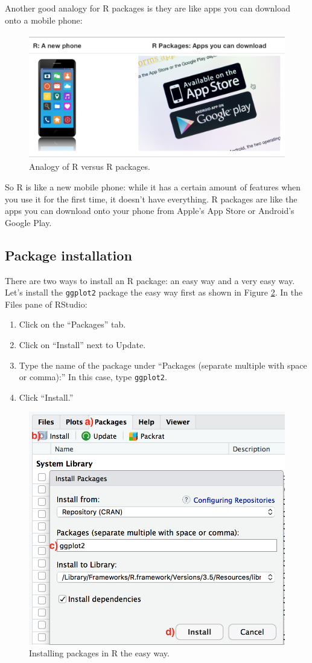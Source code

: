 \documentclass[
  12pt,
  oneside]{book}
\providecommand{\tightlist}{%
  \setlength{\itemsep}{0pt}\setlength{\parskip}{0pt}}
\begin{document}
Another good analogy for R packages  is they are like apps you can download onto a mobile phone:

\begin{figure}
\includegraphics[width=0.7\linewidth]{fig/R_vs_R_packages} \caption{Analogy of R versus R packages.}\label{fig:R-vs-R-packages}
\end{figure}

So R is like a new mobile phone: while it has a certain amount of features when you use it for the first time, it doesn't have everything. R packages are like the apps you can download onto your phone from Apple's App Store or Android's Google Play.

\hypertarget{package-installation}{%
\subsection{Package installation}\label{package-installation}}

There are two ways to install an R package: an easy way and a very easy way.  Let's install the \texttt{ggplot2} package the easy way first as shown in Figure \ref{fig:easy-way-install}. In the Files pane of RStudio:

\begin{enumerate}
\def\labelenumi{\alph{enumi})}
\tightlist
\item
  Click on the ``Packages'' tab.
\item
  Click on ``Install'' next to Update.
\item
  Type the name of the package under ``Packages (separate multiple with space or comma):'' In this case, type \texttt{ggplot2}.
\item
  Click ``Install.''
\end{enumerate}

\begin{figure}
\includegraphics[width=0.55\linewidth,height=0.55\textheight]{fig/install_packages_easy_way} \caption{Installing packages in R the easy way.}\label{fig:easy-way-install}
\end{figure}
\end{document}
